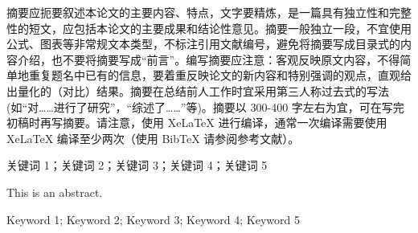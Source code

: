 \documentclass[14pt]{jnuthesis}
\begin{document}
\renewcommand{\title}{The English title} %
\renewcommand{\biaoti}{中文标题} %
\renewcommand{\xueyuan}{网络空间安全学院}
\renewcommand{\zhuanye}{网络空间安全}
\renewcommand{\xingming}{学生姓名} %
\renewcommand{\xuehao}{2019999999}
\renewcommand{\daoshi}{指导老师姓名}

\newcommand{\upcite}[1]{\textsuperscript{\cite{#1}}}
\newcommand{\upupcite}[1]{\textsuperscript{\textsuperscript{\cite{#1}}}}

\titlepage



\statement

\begin{zhabstract}


\zhaiyao
摘要应扼要叙述本论文的主要内容、特点，文字要精炼，是一篇具有独立性和完整性的短文，应包括本论文的主要成果和结论性意见。摘要一般独立一段，不宜使用公式、图表等非常规文本类型，不标注引用文献编号，避免将摘要写成目录式的内容介绍，也不要将摘要写成“前言”。编写摘要应注意：客观反映原文内容，不得简单地重复题名中已有的信息，要着重反映论文的新内容和特别强调的观点，直观给出量化的（对比）结果。摘要在总结前人工作时宜采用第三人称过去式的写法 (如“对……进行了研究”，“综述了……”等)。摘要以 300-400 字左右为宜，可在写完初稿时再写摘要。请注意，使用 XeLaTeX 进行编译，通常一次编译需要使用 XeLaTeX 编译至少两次（使用 BibTeX 请参阅参考文献）。

\guanjianci
关键词 1；关键词 2；关键词 3；关键词 4；关键词 5

\end{zhabstract}

\begin{enabstract}


\abstract
This is an abstract. 

\keywords
Keyword 1; Keyword 2; Keyword 3; Keyword 4; Keyword 5

\end{enabstract}

\end{document}
